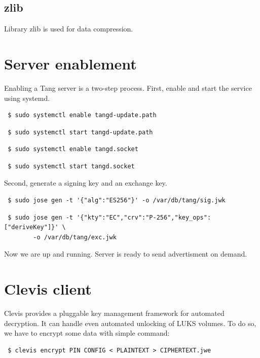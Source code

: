 \subsection{zlib}\label{zlib}
Library zlib \cite{zlib} is used for data compression.

\section{Server enablement}
Enabling a Tang server is a two-step process.
First, enable and start the service using systemd.

{\tt\begin{verbatim} $ sudo systemctl enable tangd-update.path\end{verbatim}
}

{\tt\begin{verbatim} $ sudo systemctl start tangd-update.path\end{verbatim}
}

{\tt\begin{verbatim} $ sudo systemctl enable tangd.socket\end{verbatim}
}

{\tt\begin{verbatim} $ sudo systemctl start tangd.socket\end{verbatim}
}

Second, generate a signing key and an exchange key.

{\tt\begin{verbatim} $ sudo jose gen -t '{"alg":"ES256"}' -o /var/db/tang/sig.jwk\end{verbatim}
}

{\tt\begin{verbatim} $ sudo jose gen -t '{"kty":"EC","crv":"P-256","key_ops":["deriveKey"]}' \
        -o /var/db/tang/exc.jwk\end{verbatim}
}

Now we are up and running. Server is ready to send advertisment on demand.
\todo{Get clevis in here?}


\section{Clevis client}\label{clevis}

Clevis provides a pluggable key management framework for automated decryption.
It can handle even automated unlocking of LUKS volumes.
To do so, we have to encrypt some data with simple command:

{\tt\begin{verbatim} $ clevis encrypt PIN CONFIG < PLAINTEXT > CIPHERTEXT.jwe\end{verbatim}
}

